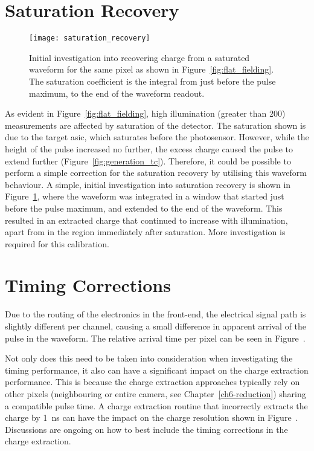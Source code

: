 \section{Saturation Recovery}

\begin{figure}
	\centering
    \texttt{[image: saturation\_recovery]} 
	\caption[Saturation Recovery.]{Initial investigation into recovering charge from a saturated waveform for the same pixel as shown in Figure~\ref{fig:flat_fielding}. The saturation coefficient is the integral from just before the pulse maximum, to the end of the waveform readout.}
	\label{fig:saturation_recovery}
\end{figure}

As evident in Figure~\ref{fig:flat_fielding}, high illumination (greater than \utilde\SI{200}{\pe}) measurements are affected by saturation of the detector. The saturation shown is due to the \gls{target} \gls{asic}, which saturates before the photosensor. However, while the height of the pulse increased no further, the excess charge caused the pulse to extend further (Figure~\ref{fig:generation_tc}). Therefore, it could be possible to perform a simple correction for the saturation recovery by utilising this waveform behaviour. A simple, initial investigation into saturation recovery is shown in Figure~\ref{fig:saturation_recovery}, where the waveform was integrated in a window that started just before the pulse maximum, and extended to the end of the waveform. This resulted in an extracted charge that continued to increase with illumination, apart from in the region immediately after saturation. More investigation is required for this calibration.

\section{Timing Corrections} \label{section:timing_corrections}

Due to the routing of the electronics in the front-end, the electrical signal path is slightly different per channel, causing a small difference in apparent arrival of the pulse in the waveform. The relative arrival time per pixel can be seen in Figure~. 

Not only does this need to be taken into consideration when investigating the timing performance, it also can have a significant impact on the charge extraction performance. This is because the charge extraction approaches typically rely on other pixels (neighbouring or entire camera, see Chapter~\ref{ch6-reduction}) sharing a compatible pulse time. A charge extraction routine that incorrectly extracts the charge by \SI{1}{ns} can have the impact on the charge resolution shown in Figure~. Discussions are ongoing on how to best include the timing corrections in the charge extraction.

